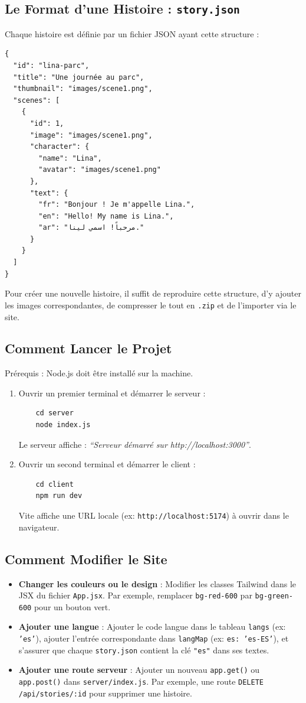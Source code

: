 \documentclass[12pt,twoside,letterpaper]{article}
\begin{document}
\subsection{Le Format d'une Histoire : \texttt{story.json}}
Chaque histoire est définie par un fichier JSON ayant cette structure :
\begin{verbatim}
{
  "id": "lina-parc",
  "title": "Une journée au parc",
  "thumbnail": "images/scene1.png",
  "scenes": [
    {
      "id": 1,
      "image": "images/scene1.png",
      "character": {
        "name": "Lina",
        "avatar": "images/scene1.png"
      },
      "text": {
        "fr": "Bonjour ! Je m'appelle Lina.",
        "en": "Hello! My name is Lina.",
        "ar": "مرحباً! اسمي لينا."
      }
    }
  ]
}
\end{verbatim}
Pour créer une nouvelle histoire, il suffit de reproduire cette structure, d'y ajouter les images correspondantes, de compresser le tout en \texttt{.zip} et de l'importer via le site.

\subsection{Comment Lancer le Projet}
Prérequis : Node.js doit être installé sur la machine.
\begin{enumerate}
    \item Ouvrir un premier terminal et démarrer le serveur :
    \begin{verbatim}
    cd server
    node index.js
    \end{verbatim}
    Le serveur affiche : \textit{``Serveur démarré sur http://localhost:3000''}.
    
    \item Ouvrir un second terminal et démarrer le client :
    \begin{verbatim}
    cd client
    npm run dev
    \end{verbatim}
    Vite affiche une URL locale (ex: \texttt{http://localhost:5174}) à ouvrir dans le navigateur.
\end{enumerate}

\subsection{Comment Modifier le Site}
\begin{itemize}
    \item \textbf{Changer les couleurs ou le design} : Modifier les classes Tailwind dans le JSX du fichier \texttt{App.jsx}. Par exemple, remplacer \texttt{bg-red-600} par \texttt{bg-green-600} pour un bouton vert.
    \item \textbf{Ajouter une langue} : Ajouter le code langue dans le tableau \texttt{langs} (ex: \texttt{'es'}), ajouter l'entrée correspondante dans \texttt{langMap} (ex: \texttt{es: 'es-ES'}), et s'assurer que chaque \texttt{story.json} contient la clé \texttt{"es"} dans ses textes.
    \item \textbf{Ajouter une route serveur} : Ajouter un nouveau \texttt{app.get()} ou \texttt{app.post()} dans \texttt{server/index.js}. Par exemple, une route \texttt{DELETE /api/stories/:id} pour supprimer une histoire.
\end{itemize}
\end{document}
